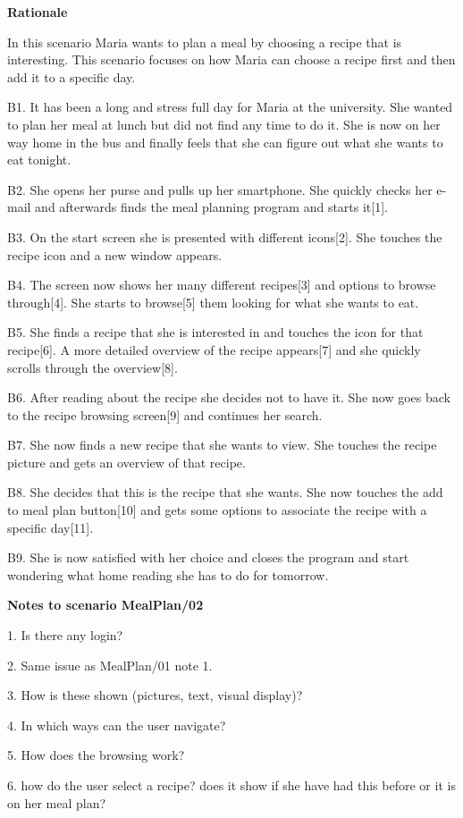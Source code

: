 \textbf{Rationale}

In this scenario Maria wants to plan a meal by choosing a recipe that is interesting. This scenario focuses on how Maria can choose a recipe first and then add it to a specific day.

	B1. It has been a long and stress full day for Maria at the university. She wanted to plan her meal at lunch but did not find any time to do it. She is now on her way home in the bus and finally feels that she can figure out what she wants to eat tonight.

	B2. She opens her purse and pulls up her smartphone. She quickly checks her e-mail and afterwards finds the meal planning program and starts it[1]. 

	B3. On the start screen she is presented with different icons[2]. She touches the recipe icon and a new window appears.

	B4. The screen now shows her many different recipes[3] and options to browse through[4]. She starts to browse[5] them looking for what she wants to eat. 

	B5. She finds a recipe that she is interested in and touches the icon for that recipe[6]. A more detailed overview of the recipe appears[7] and she quickly scrolls through the overview[8].

	B6. After reading about the recipe she decides not to have it. She now goes back to the recipe browsing screen[9] and continues her search.

	B7. She now finds a new recipe that she wants to view. She touches the recipe picture and gets an overview of that recipe. 

	B8. She decides that this is the recipe that she wants. She now touches the add to meal plan button[10] and gets some options to associate the recipe with a specific day[11].

	B9. She is now satisfied with her choice and closes the program and start wondering what home reading she has to do for tomorrow.
	
\textbf{Notes to scenario MealPlan/02}

1. Is there any login?

2. Same issue as MealPlan/01 note 1.

3. How is these shown (pictures, text, visual display)?

4. In which ways can the user navigate?

5. How does the browsing work?

6. how do the user select a recipe? does it show if she have had this before or it is on her meal 
plan?

